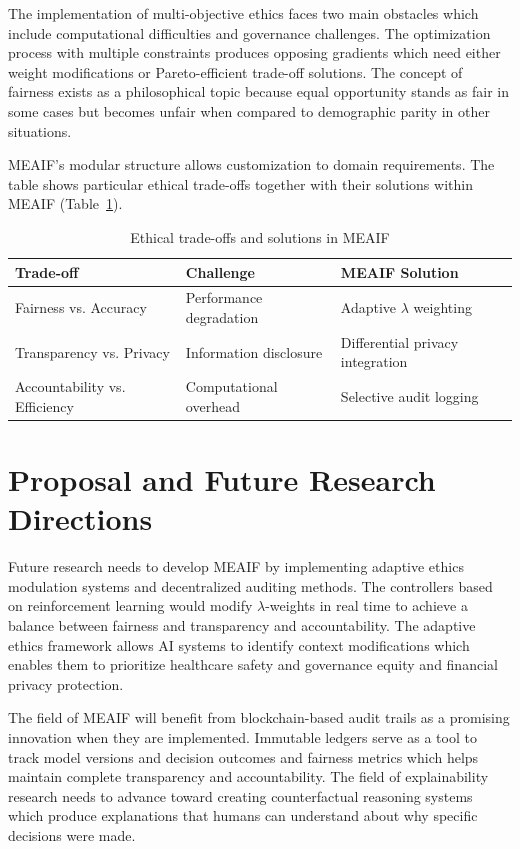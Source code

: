 \documentclass[sn-mathphys]{sn-jnl}%
\theoremstyle{thmstyleone}%
\theoremstyle{thmstyletwo}%
\theoremstyle{thmstylethree}%
\begin{document}
The implementation of multi-objective ethics faces two main obstacles which include computational difficulties and governance challenges. The optimization process with multiple constraints produces opposing gradients which need either weight modifications or Pareto-efficient trade-off solutions. The concept of fairness exists as a philosophical topic because equal opportunity stands as fair in some cases but becomes unfair when compared to demographic parity in other situations.

MEAIF's modular structure allows customization to domain requirements. The table shows particular ethical trade-offs together with their solutions within MEAIF (Table~\ref{tab:tradeoffs}).

\begin{table}[h]
\centering
\caption{Ethical trade-offs and solutions in MEAIF}
\label{tab:tradeoffs}
\begin{tabular}{lll}
\hline
\textbf{Trade-off} & \textbf{Challenge} & \textbf{MEAIF Solution} \\
\hline
Fairness vs. Accuracy & Performance degradation & Adaptive $\lambda$ weighting \\
Transparency vs. Privacy & Information disclosure & Differential privacy integration \\
Accountability vs. Efficiency & Computational overhead & Selective audit logging \\
\hline
\end{tabular}
\end{table}

\section{Proposal and Future Research Directions}\label{sec5}

Future research needs to develop MEAIF by implementing adaptive ethics modulation systems and decentralized auditing methods. The controllers based on reinforcement learning would modify $\lambda$-weights in real time to achieve a balance between fairness and transparency and accountability. The adaptive ethics framework allows AI systems to identify context modifications which enables them to prioritize healthcare safety and governance equity and financial privacy protection.

The field of MEAIF will benefit from blockchain-based audit trails as a promising innovation when they are implemented. Immutable ledgers serve as a tool to track model versions and decision outcomes and fairness metrics which helps maintain complete transparency and accountability. The field of explainability research needs to advance toward creating counterfactual reasoning systems which produce explanations that humans can understand about why specific decisions were made.
\end{document}
